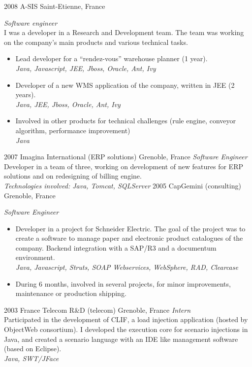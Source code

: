 \documentclass[]{k-cv} %
\begin{document}
\clearpage


\begin{entrylist}
\entry
{2008 }
{A-SIS}
{Saint-Etienne, France}
{\emph{Software engineer} \\
 I was a developer in a Research and Development team.
The team was working on the company’s main products and various technical tasks.
\begin{itemize}
\item
Lead developer for a ``rendez-vous'' warehouse planner (1 year). \\
\emph{Java, Javascript, JEE, Jboss, Oracle, Ant, Ivy}
\item
Developer of a new WMS application of the company, written in JEE (2 years). \\
\emph{Java, JEE, Jboss, Oracle, Ant, Ivy}
\item
Involved in other products for technical challenges (rule engine, conveyor algorithm, performance improvement) \\
\emph{Java}
\end{itemize}}
\entry
{2007 }
{Imagina International (ERP solutions)}
{Grenoble, France}
{\emph{Software Engineer} \\
Developer in a team of three, working on development of
new features for ERP solutions and on redesigning of billing engine. \\
\emph{
Technologies involved:
Java, Tomcat, SQLServer
}}
\entry
{2005 }
{CapGemini (consulting)}
{Grenoble, France}
{\emph{Software Engineer}
\begin{itemize}
\item
Developer in a project for Schneider Electric.
The goal of the project was to create a software to manage paper and electronic product
catalogues of the company.
Backend integration with a SAP/R3 and a documentum environment. \\
\emph{Java, Javascript, Struts, SOAP Webservices, WebSphere, RAD, Clearcase}
\item
During 6 months, involved in several projects, for minor improvements, maintenance or production shipping.
\end{itemize}}
\entry
{2003 }
{France Telecom R\&D (telecom)}
{Grenoble, France}
{\emph{Intern} \\
Participated in the development of CLIF,
a load injection application (hosted by ObjectWeb consortium).
I developed the execution core for scenario injections in Java,
and created a scenario language with an IDE like management software (based on Eclipse). \\
\emph{Java, SWT/JFace}}
\end{entrylist}
\end{document}
